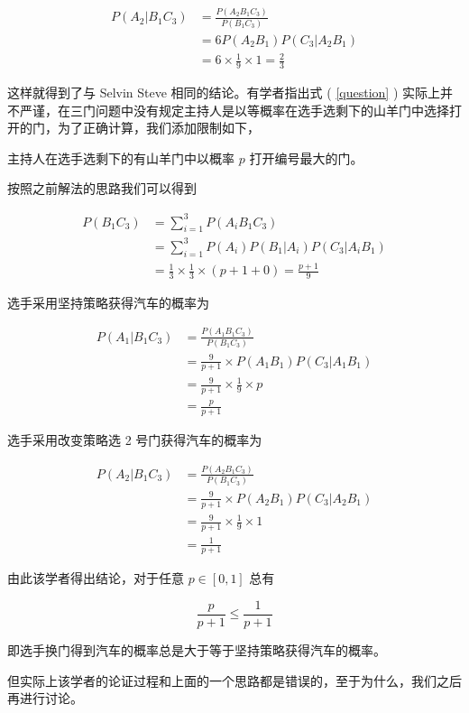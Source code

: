 \begin{align*}
P(A_2|B_1C_3)&=\frac{P(A_2B_1C_3)}{P(B_1C_3)}\\
&=6P(A_2B_1)P(C_3|A_2B_1)\\
&=6\times\frac{1}{9}\times1=\frac{2}{3}
\end{align*}

这样就得到了与 Selvin Steve 相同的结论。有学者\cite{李勇2018三门问题}指出式 ( \ref{question} ) 实际上并不严谨，在三门问题中没有规定主持人是以等概率在选手选剩下的山羊门中选择打开的门，为了正确计算，我们添加限制如下，

\par{主持人在选手选剩下的有山羊门中以概率 $p$ 打开编号最大的门。}

按照之前解法的思路我们可以得到

\begin{align*}
P(B_1C_3)&=\sum_{i=1}^3P(A_iB_1C_3)\\
&=\sum_{i=1}^3P(A_i)P(B_1|A_i)P(C_3|A_iB_1)\\
&=\frac{1}{3}\times\frac{1}{3}\times(p+1+0)=\frac{p+1}{9}
\end{align*}

选手采用坚持策略获得汽车的概率为

\begin{align*}
P(A_1|B_1C_3)&=\frac{P(A_1B_1C_3)}{P(B_1C_3)}\\
&=\frac{9}{p+1}\times P(A_1B_1)P(C_3|A_1B_1)\\
&=\frac{9}{p+1}\times\frac{1}{9}\times p\\
&=\frac{p}{p+1}
\end{align*}

选手采用改变策略选 2 号门获得汽车的概率为

\begin{align*}
P(A_2|B_1C_3)&=\frac{P(A_2B_1C_3)}{P(B_1C_3)}\\
&=\frac{9}{p+1}\times P(A_2B_1)P(C_3|A_2B_1)\\
&=\frac{9}{p+1}\times\frac{1}{9}\times1\\
&=\frac{1}{p+1}
\end{align*}

由此该学者得出结论，对于任意 $p\in[0,1]$ 总有

$$\frac{p}{p+1}\le\frac{1}{p+1}$$

即选手换门得到汽车的概率总是大于等于坚持策略获得汽车的概率。

但实际上该学者的论证过程和上面的一个思路都是错误的，至于为什么，我们之后再进行讨论。